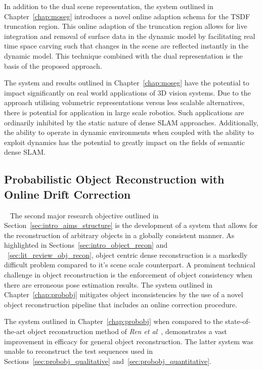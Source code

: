 In addition to the dual scene representation, the system outlined in Chapter~\ref{chap:moseg} 
introduces a novel online adaption schema for the TSDF truncation region. This online adaption 
of the truncation region allows for live integration and removal of surface data in the dynamic 
model by facilitating real time space carving such that changes in the scene are reflected 
instantly in the dynamic model. This technique combined with the dual representation is the 
basis of the proposed approach.

The system and results outlined in Chapter~\ref{chap:moseg} have the potential to impact 
significantly on real world applications of 3D vision systems. Due to the approach utilising 
volumetric representations versus less scalable alternatives, there is potential for application 
in large scale robotics. Such applications are ordinarily inhibited by the static nature of 
dense SLAM approaches. Additionally, the ability to operate in dynamic environments when coupled 
with the ability to exploit dynamics has the potential to greatly impact on the fields of semantic 
dense SLAM.

\subsection{Probabilistic Object Reconstruction with Online Drift Correction}
~\label{subsec:discussion_probobj}
The second major research objective outlined in Section~\ref{sec:intro_aims_structure} is the 
development of a system that allows for the reconstruction of arbitrary objects in a globally 
consistent manner. As highlighted in Sections~\ref{sec:intro_object_recon} and
~\ref{sec:lit_review_obj_recon}, object centric dense reconstruction is a markedly difficult 
problem compared to it's scene scale counterpart. A prominent technical challenge in object 
reconstruction is the enforcement of object consistency when there are erroneous pose estimation 
results. The system outlined in Chapter~\ref{chap:probobj} mitigates object inconsistencies by 
the use of a novel object reconstruction pipeline that includes an online correction procedure.

The system outlined in Chapter~\ref{chap:probobj} when compared to the state-of-the-art object 
reconstruction method of \textit{Ren et al}~\cite{Ren2013}, demonstrates a vast improvement in 
efficacy for general object reconstruction. The latter system was unable to reconstruct the test 
sequences used in Sections~\ref{sec:probobj_qualitative} and~\ref{sec:probobj_quantitative}. 

